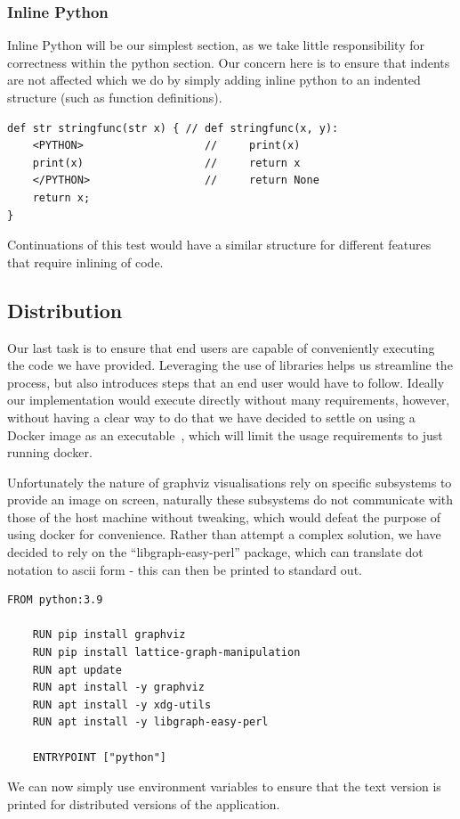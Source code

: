 \subsubsection{Inline Python}
Inline Python will be our simplest section, as we take little responsibility for correctness within the python section.
Our concern here is to ensure that indents are not affected which we do by simply adding inline python to an indented
structure (such as function definitions).

\begin{lstlisting}[caption={Testing that injections maintain indents},captionpos=b, label={lst:python-indentation-test}]
def str stringfunc(str x) { // def stringfunc(x, y):
    <PYTHON>                   //     print(x)
    print(x)                   //     return x
    </PYTHON>                  //     return None
    return x;
}
\end{lstlisting}

Continuations of this test would have a similar structure for different features that require inlining of code.

\subsection{Distribution}
Our last task is to ensure that end users are capable of conveniently executing the code we have provided.
Leveraging the use of libraries helps us streamline the process, but also introduces steps that an end user would have
to follow.
Ideally our implementation would execute directly without many requirements, however, without having a clear way to do
that we have decided to settle on using a Docker image as an executable~\cite{DockerExec}, which will limit the usage
requirements to just running docker.

Unfortunately the nature of graphviz visualisations rely on specific subsystems to provide an image on screen, naturally
these subsystems do not communicate with those of the host machine without tweaking, which would defeat the purpose of
using docker for convenience.
Rather than attempt a complex solution, we have decided to rely on the ``libgraph-easy-perl'' package, which can
translate dot notation to ascii form - this can then be printed to standard out.

\begin{lstlisting}[caption={The DockerFile used for distribution},captionpos=b,label={lst:dockerfile}]
    FROM python:3.9

    RUN pip install graphviz
    RUN pip install lattice-graph-manipulation
    RUN apt update
    RUN apt install -y graphviz
    RUN apt install -y xdg-utils
    RUN apt install -y libgraph-easy-perl

    ENTRYPOINT ["python"]
\end{lstlisting}

We can now simply use environment variables to ensure that the text version is printed for distributed versions of
the application.
